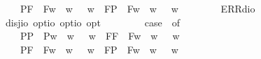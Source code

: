 \begin{isabellebody}
\ \ \ \ {\isacharparenleft}P{\isacharparenleft}{\isasymalpha}{\isacharparenright}{\isacharcomma}F{\isacharparenleft}{\isasymbeta}{\isacharparenright}{\isacharparenright}\ {\isasymRightarrow}\ F{\isacharparenleft}{\isasymlambda}w{\isachardot}\ {\isasymalpha}\ w\ {\isasymand}\ {\isasymbeta}\ w{\isacharparenright}\ {\isacharbar}\ {\isacharparenleft}F{\isacharparenleft}{\isasymalpha}{\isacharparenright}{\isacharcomma}P{\isacharparenleft}{\isasymbeta}{\isacharparenright}{\isacharparenright}\ {\isasymRightarrow}\ F{\isacharparenleft}{\isasymlambda}w{\isachardot}\ {\isasymalpha}\ w\ {\isasymand}\ {\isasymbeta}\ w{\isacharparenright}\ {\isacharbar}\ \isanewline
\ \ \ \ {\isacharunderscore}\ {\isasymRightarrow}\ ERR{\isacharparenleft}dio{\isacharparenright}{\isachardoublequoteclose}\ \ \isanewline
\isanewline
\ \isamarkupfalse%
\ disj{\isacharcolon}{\isacharcolon}{\isachardoublequoteopen}io\ opt{\isasymRightarrow}io\ opt{\isasymRightarrow}io\ opt{\isachardoublequoteclose}\ {\isacharparenleft}\ {\isachardoublequoteopen}\isactrlbold {\isasymor}{\isachardoublequoteclose}\ {}{}{\isacharparenright}\ \ {\isachardoublequoteopen}{\isasymphi}\ \isactrlbold {\isasymor}\ {\isasympsi}\ {\isasymequiv}\ case\ {\isacharparenleft}{\isasymphi}{\isacharcomma}{\isasympsi}{\isacharparenright}\ of\isanewline
\ \ \ \ {\isacharparenleft}P{\isacharparenleft}{\isasymalpha}{\isacharparenright}{\isacharcomma}P{\isacharparenleft}{\isasymbeta}{\isacharparenright}{\isacharparenright}\ {\isasymRightarrow}\ P{\isacharparenleft}{\isasymlambda}w{\isachardot}\ {\isasymalpha}\ w\ {\isasymor}\ {\isasymbeta}\ w{\isacharparenright}\ {\isacharbar}\ {\isacharparenleft}F{\isacharparenleft}{\isasymalpha}{\isacharparenright}{\isacharcomma}F{\isacharparenleft}{\isasymbeta}{\isacharparenright}{\isacharparenright}\ {\isasymRightarrow}\ F{\isacharparenleft}{\isasymlambda}w{\isachardot}\ {\isasymalpha}\ w\ {\isasymor}\ {\isasymbeta}\ w{\isacharparenright}\ {\isacharbar}\ \isanewline
\ \ \ \ {\isacharparenleft}P{\isacharparenleft}{\isasymalpha}{\isacharparenright}{\isacharcomma}F{\isacharparenleft}{\isasymbeta}{\isacharparenright}{\isacharparenright}\ {\isasymRightarrow}\ F{\isacharparenleft}{\isasymlambda}w{\isachardot}\ {\isasymalpha}\ w\ {\isasymor}\ {\isasymbeta}\ w{\isacharparenright}\ {\isacharbar}\ {\isacharparenleft}F{\isacharparenleft}{\isasymalpha}{\isacharparenright}{\isacharcomma}P{\isacharparenleft}{\isasymbeta}{\isacharparenright}{\isacharparenright}\ {\isasymRightarrow}\ F{\isacharparenleft}{\isasymlambda}w{\isachardot}\ {\isasymalpha}\ w\ {\isasymor}\ {\isasymbeta}\ w{\isacharparenright}\ {\isacharbar}\ \isanewline

\end{isabellebody}
